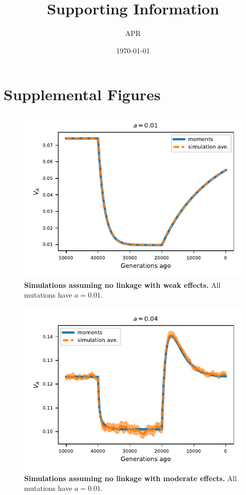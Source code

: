 \documentclass[]{article}
\title{Supporting Information}
\author{APR}
\date{\today}
\begin{document}
\maketitle

\section{Supplemental Figures}

\begin{figure}[ht!]
    \centering
    \includegraphics{../figures/one_pop.a_0.01.pdf}
    \caption{
        \textbf{Simulations assuming no linkage with weak effects.}
        All mutations have $a=0.01$.
    }
    \label{fig:one-popA}
\end{figure}

\begin{figure}[ht!]
    \centering
    \includegraphics{../figures/one_pop.a_0.04.pdf}
    \caption{
        \textbf{Simulations assuming no linkage with moderate effects.}
        All mutations have $a=0.01$.
    }
    \label{fig:one-popB}
\end{figure}
\end{document}
